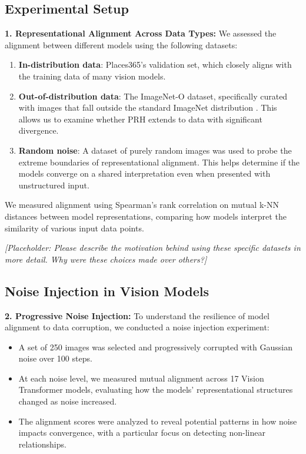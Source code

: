 \documentclass[10pt,a4paper]{article}
\begin{document}
\subsection{Experimental Setup}
\textbf{1. Representational Alignment Across Data Types:} We assessed the alignment between different models using the following datasets:
\begin{enumerate}
    \item \textbf{In-distribution data}: Places365’s validation set, which closely aligns with the training data of many vision models.
    \item \textbf{Out-of-distribution data}: The ImageNet-O dataset, specifically curated with images that fall outside the standard ImageNet distribution \cite{hendrycks2021nae}. This allows us to examine whether PRH extends to data with significant divergence.
    \item \textbf{Random noise}: A dataset of purely random images was used to probe the extreme boundaries of representational alignment. This helps determine if the models converge on a shared interpretation even when presented with unstructured input.
\end{enumerate}

We measured alignment using Spearman's rank correlation on mutual k-NN distances between model representations, comparing how models interpret the similarity of various input data points.

\textit{[Placeholder: Please describe the motivation behind using these specific datasets in more detail. Why were these choices made over others?]}

\subsection{Noise Injection in Vision Models}
\textbf{2. Progressive Noise Injection:} To understand the resilience of model alignment to data corruption, we conducted a noise injection experiment:
\begin{itemize}
    \item A set of 250 images was selected and progressively corrupted with Gaussian noise over 100 steps.
    \item At each noise level, we measured mutual alignment across 17 Vision Transformer models, evaluating how the models' representational structures changed as noise increased.
    \item The alignment scores were analyzed to reveal potential patterns in how noise impacts convergence, with a particular focus on detecting non-linear relationships.
\end{itemize}
\end{document}
